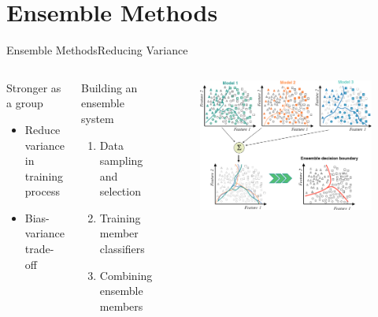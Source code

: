 \section{Ensemble Methods}
\begin{frame}{Ensemble Methods}{Reducing Variance}
\begin{columns}
    \begin{block}{Stronger as a group}
    \begin{itemize}
        \item Reduce variance in training process
        \item Bias-variance trade-off 
    \end{itemize}
\end{block}
\begin{block}{Building an ensemble system}
    \begin{enumerate}
        \item Data sampling and selection
        \item Training member classifiers
        \item Combining ensemble members
    \end{enumerate}
\end{block}
        \begin{figure}
        \includegraphics[width=1.0 \textwidth]{figs/variancereduction.png}
    	\end{figure}
    \end{columns}
\end{frame}